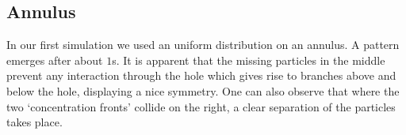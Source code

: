 \begin{minipage}{0.45\textwidth}
\subsection{Annulus}
In our first simulation we used an uniform distribution on an annulus.
A pattern emerges after about $1$s.
It is apparent that the missing particles in the middle prevent any interaction through the hole which gives rise to branches above and below the hole, displaying a nice symmetry.
One can also observe that where the two \lq{}concentration fronts\rq{} collide on the right, a clear separation of the particles takes place.
\end{minipage}